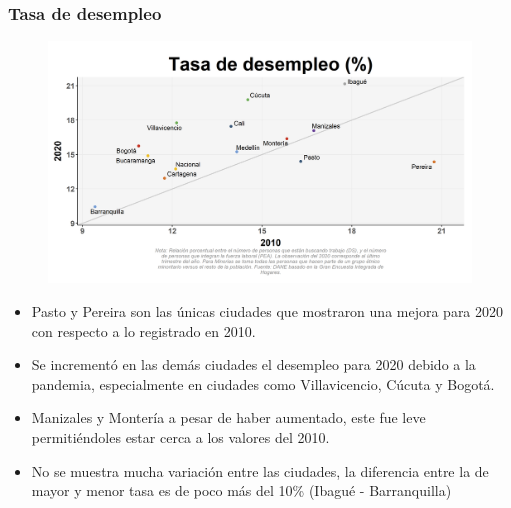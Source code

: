        \subsubsection{Tasa de desempleo}

    \begin{figure}[H]
        \caption[Tasa de desempleo por ciudades - 2010 VS 2020 ]{\label{desemp_ciudad_scatter} }
        \begin{center}
        \includegraphics[width=\textwidth,keepaspectratio]{img/var_45_scatter_time.png}
        \end{center}
    \end{figure}
            \begin{itemize}
                \item Pasto y Pereira son las únicas ciudades que mostraron una mejora para 2020 con respecto a lo registrado en 2010.
                \item Se incrementó en las demás ciudades el desempleo para 2020 debido a la pandemia, especialmente en ciudades como Villavicencio, Cúcuta y Bogotá.
                \item Manizales y Montería a pesar de haber aumentado, este fue leve permitiéndoles estar cerca a los valores del 2010.
                \item No se muestra mucha variación entre las ciudades, la diferencia entre la de mayor y menor tasa es de poco más del 10\% (Ibagué - Barranquilla)
                \end{itemize}

